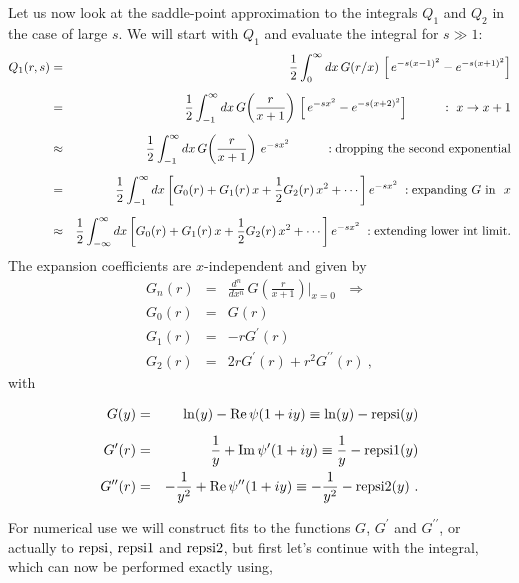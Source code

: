 \documentclass[preprint,12pt,eqsecnum,nofootinbib,amsmath,amssymb]{revtex4}
\begin{document}
Let us now look at the saddle-point approximation to the 
integrals $Q_1$ and $Q_2$  in the case of large $s$. We 
will start with $Q_1$ and evaluate the integral for $s 
\gg 1$:
\begin{eqnarray}
  Q_1(r,s) 
  &=&
  \frac{1}{2}\int_0^\infty dx \,G(r/x)\, 
  \left[\,e^{-s(x-1)^2} - e^{-s(x+1)^2} \right] 
\\[5pt]
  &=&
  \frac{1}{2}\int_{-1}^\infty dx \,G\!\left(\frac{r}{x+1}
  \right)\, \left[\,e^{-s x^2} - e^{-s(x+2)^2} \right] 
  \hskip1cm :~x \to x+1
\\[5pt]
  &\approx&
  \frac{1}{2}\int_{-1}^\infty dx \,G\!\left(\frac{r}{x+1}
  \right)\, e^{-s x^2} 
  \hskip1cm :{\rm dropping~the~second~exponential}
\\[5pt]
  &=&
  \frac{1}{2}\int_{-1}^\infty dx \left[G_0(r) + G_1(r) \, x +
  \frac{1}{2}G_2(r) \, x^2 + \cdots \right]e^{-s x^2} 
  \hskip0.1cm :{\rm expanding~} G {\rm ~in~~} x
\\[5pt]
\nonumber
  &\approx&
  \frac{1}{2}\int_{-\infty}^\infty dx
  \left[G_0(r) + G_1(r) \, x + \frac{1}{2}G_2(r) \, 
   x^2 + \cdots \right] e^{-s x^2} 
  \hskip0.1cm :{\rm extending~lower~int~limit}.
\end{eqnarray}
The expansion coefficients are $x$-independent and 
given by 
\begin{eqnarray}
  G_n(r) &=& \frac{d^n}{dx^n}\,G\!\left(\frac{r}{x+1}
  \right) \Bigg\vert_{x=0} ~~~\Rightarrow
\\[10pt]
  G_0(r) &=& G(r)
\\
  G_1(r) &=& - r G^\prime(r)
\\
  G_2(r) &=& 2 r G^\prime(r) + r^2 G^{\prime\prime}(r) \ ,
\end{eqnarray}
with 


\vbox{
\begin{eqnarray}
  G(y) &=& \ln(y) - {\rm Re}\,\psi(1 + i y) \equiv
  \ln(y) - {\rm repsi}(y)
\\[5pt]
  G^\prime(r) &=& \frac{1}{y} + {\rm Im}\,\psi^\prime(1+ i y)
  \equiv \frac{1}{y} - {\rm repsi1}(y)
\\
  G^{\prime\prime}(r) &=& -\frac{1}{y^2} + 
  {\rm Re}\,\psi^{\prime\prime}(1+ i y) 
  \equiv -\frac{1}{y^2} - {\rm repsi2}(y)  \ .
\end{eqnarray}
}%

\noindent
For numerical use we will construct fits to the functions
$G$, $G^\prime$ and $G^{\prime\prime}$, or actually to 
${\rm repsi}$, ${\rm repsi1}$ and ${\rm repsi2}$, but first 
let's continue with the integral, which can now be performed 
exactly using, 
\end{document}
